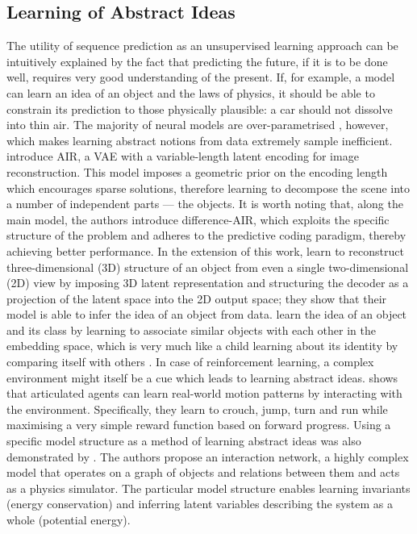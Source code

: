     \subsection{Learning of Abstract Ideas}
        The utility of sequence prediction as an unsupervised learning approach can be intuitively explained by the fact that predicting the future, if it is to be done well, requires very good understanding of the present. If, for example, a model can learn an idea of an object and the laws of physics, it should be able to constrain its prediction to those physically plausible: \eg a car should not dissolve into thin air. The majority of neural models are over-parametrised \citep{Denil2013}, however, which makes learning abstract notions from data extremely sample inefficient. \cite{Eslami2016} introduce AIR, a VAE with a variable-length latent encoding for image reconstruction. This model imposes a geometric prior on the encoding length which encourages sparse solutions, therefore learning to decompose the scene into a number of independent parts --- the objects. It is worth noting that, along the main model, the authors introduce difference-AIR, which exploits the specific structure of the problem and adheres to the predictive coding paradigm, thereby achieving better performance. In the extension of this work, \cite{Rezende2016} learn to reconstruct three-dimensional (3D) structure of an object from even a single two-dimensional (2D) view by imposing 3D latent representation and structuring the decoder as a projection of the latent space into the 2D output space; they show that their model is able to infer the idea of an object from data.
        \cite{Haeusser2017} learn the idea of an object and its class by learning to associate similar objects with each other in the embedding space, which is very much like a child learning about its identity by comparing itself with others \citep{Decety2003}.
        In case of reinforcement learning, a complex environment might itself be a cue which leads to learning abstract ideas. \cite{Heess2017} shows that articulated agents can learn real-world motion patterns by interacting with the environment. Specifically, they learn to crouch, jump, turn and run while maximising a very simple reward function based on forward progress.
        Using a specific model structure as a method of learning abstract ideas was also demonstrated by \cite{Battaglia2016}. The authors propose an interaction network, a highly complex model that operates on a graph of objects and relations between them and acts as a physics simulator. The particular model structure enables learning invariants (\eg energy conservation) and inferring latent variables describing the system as a whole (\eg potential energy).
        
